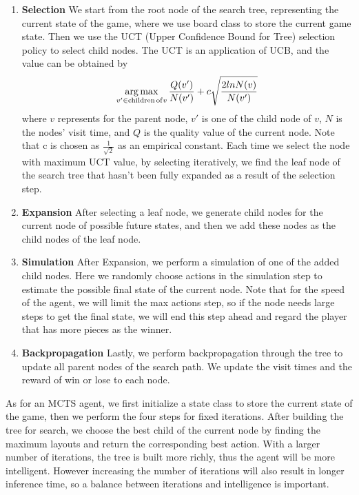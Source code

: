 \begin{enumerate}
    \item \textbf{Selection} We start from the root node of the search tree, representing the current state of the game, where we use board class to store the current game state. Then we use the UCT (Upper Confidence Bound for Tree) selection policy to select child nodes. The UCT is an application of UCB, and the value can be obtained by $$\mathop{\arg\max}\limits_{v' \in {\rm children \, of} v} \dfrac{Q(v')}{N(v')} + c \sqrt{\dfrac{2 lnN(v)}{N(v')}}$$ where $v$ represents for the parent node, $v'$ is one of the child node of $v$, $N$ is the nodes' visit time, and $Q$ is the quality value of the current node. Note that c is chosen as $\frac{1}{\sqrt{2}}$ as an empirical constant. Each time we select the node with maximum UCT value, by selecting iteratively, we find the leaf node of the search tree that hasn't been fully expanded as a result of the selection step. 
    \item \textbf{Expansion} After selecting a leaf node, we generate child nodes for the current node of possible future states, and then we add these nodes as the child nodes of the leaf node. 
    \item \textbf{Simulation} After Expansion, we perform a simulation of one of the added child nodes. Here we randomly choose actions in the simulation step to estimate the possible final state of the current node. Note that for the speed of the agent, we will limit the max actions step, so if the node needs large steps to get the final state, we will end this step ahead and regard the player that has more pieces as the winner. 
    \item \textbf{Backpropagation} Lastly, we perform backpropagation through the tree to update all parent nodes of the search path. We update the visit times and the reward of win or lose to each node.
\end{enumerate}
As for an MCTS agent, we first initialize a state class to store the current state of the game, then we perform the four steps for fixed iterations. After building the tree for search, we choose the best child of the current node by finding the maximum layouts and return the corresponding best action. With a larger number of iterations, the tree is built more richly, thus the agent will be more intelligent. However increasing the number of iterations will also result in longer inference time, so a balance between iterations and intelligence is important. 


